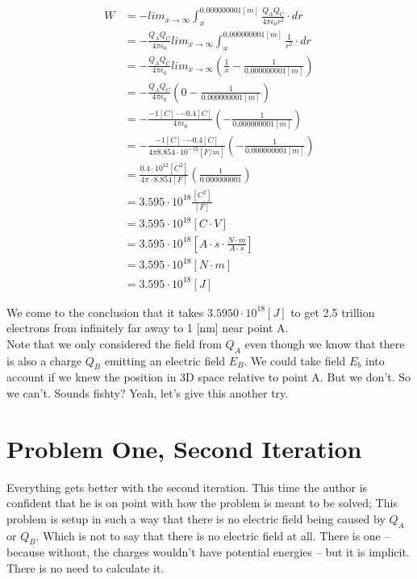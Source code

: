 \documentclass[paper=a4, fontsize=11pt]{scrartcl} %
\numberwithin{equation}{section} %
\numberwithin{figure}{section} %
\numberwithin{table}{section} %
\begin{document}
\begin{align} \label{eq:8}
W &= - lim_{x\to\infty} \int_x^{0.000000001[m]}{\frac{Q_A Q_C}{4 \pi \epsilon_0 r^2}} \cdot dr \\
  &= - \frac{Q_A Q_C}{4 \pi \epsilon_0 } lim_{x\to\infty} \int_x^{0.000000001[m]}{\frac{1}{r^2}} \cdot dr \\
  &= - \frac{Q_A Q_C}{4 \pi \epsilon_0 } lim_{x\to\infty} \left( \frac{1}{x} - \frac{1}{0.000000001[m]} \right) \\
  &= - \frac{Q_A Q_C}{4 \pi \epsilon_0 } \left( 0 - \frac{1}{0.000000001[m]} \right) \\
  &= - \frac{-1[C] \cdot -0.4[C]}{4 \pi \epsilon_0 } \left( - \frac{1}{0.000000001[m]} \right) \\
  &= - \frac{-1[C] \cdot -0.4[C]}{4 \pi 8.854 \cdot 10 ^ {-12} [F/m] } \left( - \frac{1}{0.000000001[m]} \right) \\
  &= \frac{0.4 \cdot 10 ^ {12} [C^2]}{4 \pi \cdot 8.854 [F]} \left( \frac{1}{0.000000001} \right) \\
  &= 3.595 \cdot 10^{18} \frac{[C^2]}{[F]} \\
  &= 3.595 \cdot 10^{18} [C \cdot V] \\
  &= 3.595 \cdot 10^{18} \left[A \cdot s \cdot \frac{N \cdot m}{A \cdot s}\right] \\
  &= 3.595 \cdot 10^{18} [N \cdot m] \\
  &= 3.595 \cdot 10^{18} [J]
\end{align}

We come to the conclusion that it takes $3.5950 \cdot 10^{18} [J]$ to get 2.5 trillion electrons from infinitely far away
to 1 [nm] near point A. \\

Note that we only considered the field from $Q_A$ even though we know that there is also a charge
$Q_B$ emitting an electric field $E_B$. We could take field $E_b$ into account if we knew the position in 3D space relative to
point A. But we don't. So we can't. Sounds fishty? Yeah, let's give this another try.



\section{ Problem One, Second Iteration}
Everything gets better with the second iteration. This time the author is confident that he is on point with
how the problem is meant to be solved; This problem is setup in such a way that there is no electric field being caused by $Q_A$ or $Q_B$.
Which is not to say that there is no electric field at all.
There is one -- because without, the charges wouldn't have potential energies -- but it is implicit. There is no need to calculate it. \\
\end{document}
